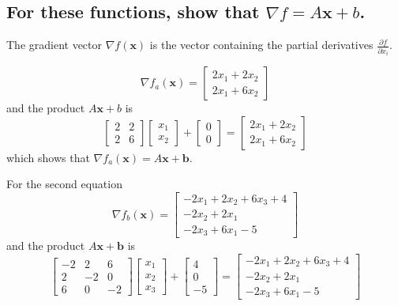 \documentclass[11pt]{scrartcl}
\newcommand{\vect}{\boldsymbol}
\begin{document}
\subsection{For these functions, show that $\nabla f = A\vect{x}+b$.}
The gradient vector $\nabla f(\vect{x})$ is the vector containing the partial derivatives
$\frac{\partial f}{\partial x_i}$.

$$
\nabla f_a(\vect{x}) =
\begin{bmatrix}
	2x_1 + 2x_2 \\
	2x_1 + 6x_2
\end{bmatrix}
$$
and the product $A\vect{x} + b$ is 
$$
\begin{bmatrix}
	2 & 2\\
	2 & 6
\end{bmatrix}
\begin{bmatrix}
	x_1\\
	x_2
\end{bmatrix}
+
\begin{bmatrix}
	0\\
	0
\end{bmatrix}
=
\begin{bmatrix}
	2x_1 + 2x_2\\
	2x_1 + 6x_2
\end{bmatrix}
$$
which shows that $\nabla f_a(\vect{x}) = A\vect{x} + \vect{b}$.

For the second equation
$$
\nabla f_b (\vect{x}) = 
\begin{bmatrix}
	-2x_1 + 2x_2 + 6x_3 + 4\\
	-2x_2 + 2x_1\\
	-2x_3 + 6x_1 -5
\end{bmatrix}
$$
and the product $A\vect{x}+\vect{b}$ is 
$$
\begin{bmatrix}
	-2 & 2 & 6\\
	2 & -2 & 0\\
	6 & 0 & -2
\end{bmatrix}
\begin{bmatrix}
	x_1\\
	x_2\\
	x_3
\end{bmatrix}
+
\begin{bmatrix}
	4\\
	0\\
	-5
\end{bmatrix}
=
\begin{bmatrix}
	-2x_1 + 2x_2 + 6x_3 + 4\\
	-2x_2 + 2x_1\\
	-2x_3 + 6x_1 -5
\end{bmatrix}
$$
\end{document}
